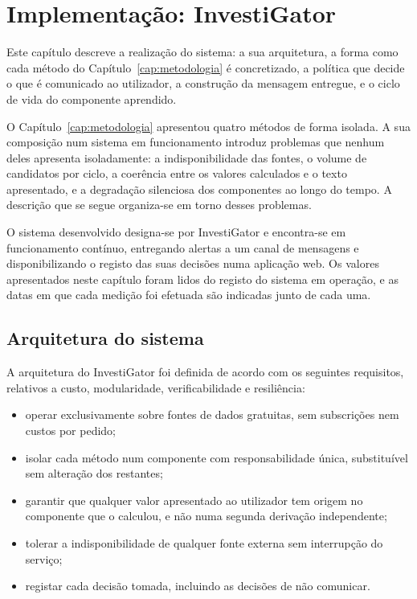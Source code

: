 \chapter{Implementação: InvestiGator}
\label{cap:sistema}

Este capítulo descreve a realização do sistema: a sua arquitetura, a forma como cada método do
Capítulo~\ref{cap:metodologia} é concretizado, a política que decide o que é comunicado ao
utilizador, a construção da mensagem entregue, e o ciclo de vida do componente aprendido.

O Capítulo~\ref{cap:metodologia} apresentou quatro métodos de forma isolada. A sua composição num sistema em funcionamento introduz problemas que nenhum deles apresenta
isoladamente: a indisponibilidade das fontes, o volume de candidatos por ciclo, a coerência entre
os valores calculados e o texto apresentado, e a degradação silenciosa dos componentes ao longo do
tempo. A descrição que se segue organiza-se em
torno desses problemas.

O sistema desenvolvido designa-se por InvestiGator e encontra-se em funcionamento contínuo,
entregando alertas a um canal de mensagens e disponibilizando o registo das suas decisões numa
aplicação web. Os valores apresentados neste capítulo foram lidos do registo do sistema em
operação, e as datas em que cada medição foi efetuada são indicadas junto de cada uma.

\section{Arquitetura do sistema}
\label{sec:sis_arquitetura}

A arquitetura do InvestiGator foi definida de acordo com os seguintes requisitos, relativos a
custo, modularidade, verificabilidade e resiliência:

\begin{itemize}
  \item operar exclusivamente sobre fontes de dados gratuitas, sem subscrições nem custos por
        pedido;
  \item isolar cada método num componente com responsabilidade única, substituível sem alteração
        dos restantes;
  \item garantir que qualquer valor apresentado ao utilizador tem origem no componente que o
        calculou, e não numa segunda derivação independente;
  \item tolerar a indisponibilidade de qualquer fonte externa sem interrupção do serviço;
  \item registar cada decisão tomada, incluindo as decisões de não comunicar.
\end{itemize}

